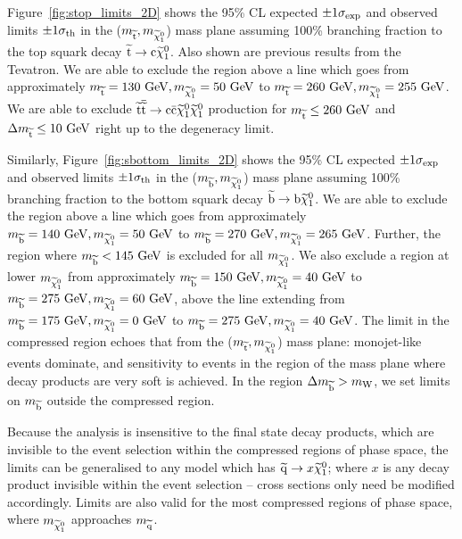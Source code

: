 Figure~\ref{fig:stop_limits_2D} shows the 95\% \ac{CL} expected $\pm 1 \sigma_{\rm exp}$ and observed limits $\pm 1 \sigma_{\rm th}$ in the ($m_{\widetilde{{\rm t}}},m_{\widetilde{\chi}^{0}_{1}}$) mass plane assuming 100\% branching fraction to the top squark decay $\widetilde{{\rm t}} \rightarrow {\rm c} \widetilde{\chi}^{0}_{1}$.
Also shown are previous results from the Tevatron.
We are able to exclude the region above a line which goes from approximately $m_{\widetilde{{\rm t}}}=130~\mathrm{GeV}, m_{\widetilde{\chi}^{0}_{1}}=50~\mathrm{GeV}$ to $m_{\widetilde{{\rm t}}}=260~\mathrm{GeV}, m_{\widetilde{\chi}^{0}_{1}}=255~\mathrm{GeV}$.  
We are able to exclude $\widetilde{{\rm t}} \overline{\widetilde{\mathrm{t}}} \rightarrow \rm c \bar{\rm c} \widetilde{\chi}^{0}_{1} \widetilde{\chi}^{0}_{1}$ production for $m_{\widetilde{{\rm t}}} \leq 260~\mathrm{GeV}$ and $\Delta m_{\widetilde{{\rm t}}} \leq 10~\mathrm{GeV}$ right up to the degeneracy limit. 

Similarly, Figure~\ref{fig:sbottom_limits_2D} shows the 95\% \ac{CL} expected $\pm 1 \sigma_{\rm exp}$ and observed limits $\pm 1 \sigma_{\rm th}$ in the ($m_{\widetilde{{\rm b}}},m_{\widetilde{\chi}^{0}_{1}}$) mass plane assuming 100\% branching fraction to the bottom squark decay $\widetilde{{\rm b}} \rightarrow {\rm b} \widetilde{\chi}^{0}_{1}$.
We are able to exclude the region above a line which goes from approximately $m_{\widetilde{{\rm b}}}=140~\mathrm{GeV}, m_{\widetilde{\chi}^{0}_{1}}=50~\mathrm{GeV}$ to $m_{\widetilde{{\rm b}}}=270~\mathrm{GeV}, m_{\widetilde{\chi}^{0}_{1}}=265~\mathrm{GeV}$.  
Further, the region where $m_{\widetilde{{\rm b}}} < 145~\mathrm{GeV}$ is excluded for all $m_{\widetilde{\chi}^{0}_{1}}$.
We also exclude a region at lower $m_{\widetilde{\chi}^{0}_{1}}$ from approximately $m_{\widetilde{{\rm b}}}=150~\mathrm{GeV}, m_{\widetilde{\chi}^{0}_{1}}=40~\mathrm{GeV}$ to $m_{\widetilde{{\rm b}}}=275~\mathrm{GeV}, m_{\widetilde{\chi}^{0}_{1}}=60~\mathrm{GeV}$, above the line extending from $m_{\widetilde{{\rm b}}}=175~\mathrm{GeV}, m_{\widetilde{\chi}^{0}_{1}}=0~\mathrm{GeV}$ to $m_{\widetilde{{\rm b}}}=275~\mathrm{GeV}, m_{\widetilde{\chi}^{0}_{1}}=40~\mathrm{GeV}$.
The limit in the compressed region echoes that from the ($m_{\widetilde{{\rm t}}},m_{\widetilde{\chi}^{0}_{1}}$) mass plane: monojet-like events dominate, and sensitivity to events in the region of the mass plane where decay products are very soft is achieved. 
In the region $\Delta m_{\widetilde{{\rm b}}}>m_{\mathrm{W}}$, we set limits on $m_{\widetilde{{\rm b}}}$ outside the compressed region. 

Because the analysis is insensitive to the final state decay products, which are invisible to the event selection within the compressed regions of phase space, the limits can be generalised to any model which has $\widetilde{{\rm q}} \rightarrow x \widetilde{\chi}^{0}_{1}$; where $x$ is any decay product invisible within the event selection -- cross sections only need be modified accordingly. 
Limits are also valid for the most compressed regions of phase space, where $m_{\widetilde{\chi}^{0}_{1}}$ approaches $m_{\widetilde{{\rm q}}}$.


